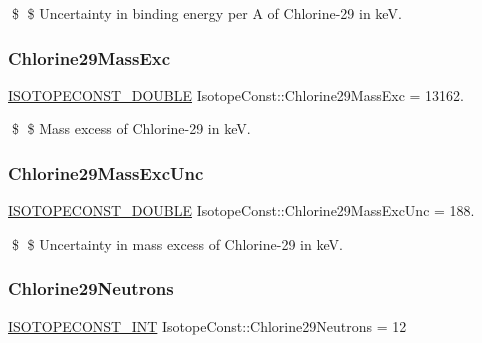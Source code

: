 \$ \$ Uncertainty in binding energy per A of Chlorine-\/29 in keV. \mbox{\label{group___isotope_const-_chlorine-_cl29_ga1d41cc73518f667d03d696fe07924e0e}} 
\subsubsection{\texorpdfstring{Chlorine29\+Mass\+Exc}{Chlorine29MassExc}}
{\footnotesize\ttfamily \mbox{\hyperlink{group___isotope_const-_macros_ga8f45a7272ce02c0b4c65c44636ed719a}{I\+S\+O\+T\+O\+P\+E\+C\+O\+N\+S\+T\+\_\+\+D\+O\+U\+B\+LE}} Isotope\+Const\+::\+Chlorine29\+Mass\+Exc = 13162.}

\$ \$ Mass excess of Chlorine-\/29 in keV. \mbox{\label{group___isotope_const-_chlorine-_cl29_ga9563782187f1101da31e354e7a6f852f}} 
\subsubsection{\texorpdfstring{Chlorine29\+Mass\+Exc\+Unc}{Chlorine29MassExcUnc}}
{\footnotesize\ttfamily \mbox{\hyperlink{group___isotope_const-_macros_ga8f45a7272ce02c0b4c65c44636ed719a}{I\+S\+O\+T\+O\+P\+E\+C\+O\+N\+S\+T\+\_\+\+D\+O\+U\+B\+LE}} Isotope\+Const\+::\+Chlorine29\+Mass\+Exc\+Unc = 188.}

\$ \$ Uncertainty in mass excess of Chlorine-\/29 in keV. \mbox{\label{group___isotope_const-_chlorine-_cl29_ga5ce460aaf621ad57b14cb2d948a94950}} 
\subsubsection{\texorpdfstring{Chlorine29\+Neutrons}{Chlorine29Neutrons}}
{\footnotesize\ttfamily \mbox{\hyperlink{group___isotope_const-_macros_ga5f18360b3e99483a35c32d789e62621c}{I\+S\+O\+T\+O\+P\+E\+C\+O\+N\+S\+T\+\_\+\+I\+NT}} Isotope\+Const\+::\+Chlorine29\+Neutrons = 12}

